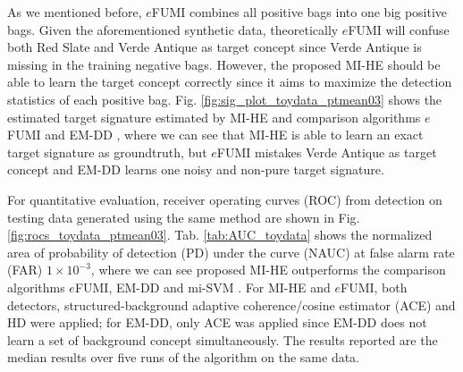\documentclass{article}
\begin{document}
	As we mentioned before, $e$FUMI combines all positive bags into one big positive bags. Given the aforementioned synthetic data, theoretically $e$FUMI will confuse both Red Slate and Verde Antique as target concept since Verde Antique is missing in the training negative bags. However, the proposed MI-HE should be able to learn the target concept correctly since it aims to maximize the detection statistics of each positive bag. Fig. \ref{fig:sig_plot_toydata_ptmean03} shows the estimated target signature estimated by MI-HE and comparison algorithms $e$FUMI \cite{Zare:2015fumi} and EM-DD \cite{Zhang:2002}, where we can see that MI-HE is able to learn an exact target signature as groundtruth, but $e$FUMI mistakes Verde Antique as target concept and EM-DD learns one noisy and non-pure target signature. 
	
	
	For quantitative evaluation, receiver operating curves (ROC) from detection on testing data generated using the same method are shown in Fig. \ref{fig:rocs_toydata_ptmean03}. Tab. \ref{tab:AUC_toydata} shows the normalized area of probability of detection (PD) under the curve (NAUC) at false alarm rate (FAR) $1\times 10^{-3}$, where we can see proposed MI-HE outperforms the comparison algorithms $e$FUMI, EM-DD and mi-SVM \cite{andrews:2002}. For MI-HE and $e$FUMI, both detectors, structured-background adaptive coherence/cosine estimator (ACE) \cite{Kraut:1999, basener:2010clutter} and HD \cite{Broadwater:2007} were applied; for EM-DD, only ACE was applied since EM-DD does not learn a set of background concept simultaneously. The results reported are the median results over five runs of the algorithm on the same data.   
	
	
			
\end{document}
